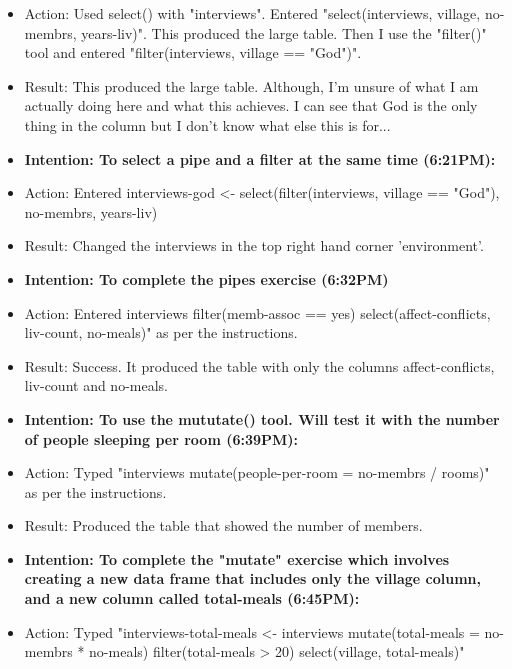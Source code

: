 \documentclass[a4paper,12pt]{article}
\begin{document}
\begin{itemize}
\item Action: Used select() with "interviews". Entered "select(interviews, village, no-membrs, years-liv)". This produced the large table. Then I use the "filter()" tool and entered "filter(interviews, village == "God")".


\item Result: This produced the large table. Although, I'm unsure of what I am actually doing here and what this achieves. I can see that God is the only thing in the column but I don't know what else this is for...


\item \textbf{Intention: To select a pipe and a filter at the same time (6:21PM):}


\item Action: Entered interviews-god <- select(filter(interviews, village == "God"), no-membrs, years-liv)


\item Result: Changed the interviews in the top right hand corner 'environment'. 


\item \textbf{Intention: To complete the pipes exercise (6:32PM)}


\item Action: Entered interviews
    filter(memb-assoc == yes) 
    select(affect-conflicts, liv-count, no-meals)" as per the instructions. 
    

\item Result: Success. It produced the table with only the columns affect-conflicts, liv-count and no-meals.


\item \textbf{Intention: To use the mututate() tool. Will test it with the number of people sleeping per room (6:39PM):}


\item Action: Typed "interviews
    mutate(people-per-room = no-membrs / rooms)" as per the instructions. 
    
    
\item Result: Produced the table that showed the number of members. 


\item \textbf{Intention: To complete the "mutate" exercise which involves creating a new data frame that includes only the village column, and a new column called total-meals (6:45PM):}


\item Action: Typed "interviews-total-meals <- interviews
    mutate(total-meals = no-membrs * no-meals) 
    filter(total-meals > 20)
    select(village, total-meals)"
    


\end{itemize}
\end{document}
